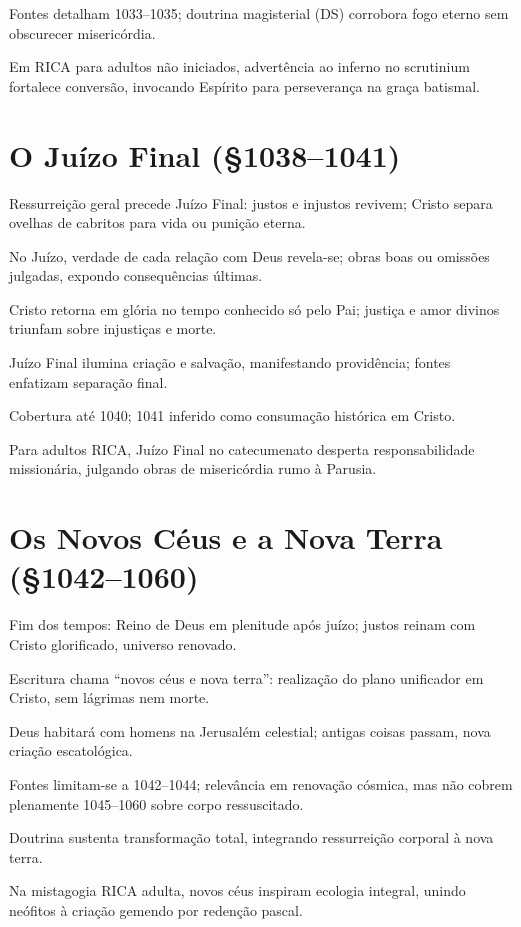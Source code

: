 Fontes detalham 1033--1035; doutrina magisterial (DS) corrobora fogo eterno sem obscurecer misericórdia.

Em RICA para adultos não iniciados, advertência ao inferno no scrutinium fortalece conversão, invocando Espírito para perseverança na graça batismal.

\section{O Juízo Final (\S 1038--1041)}

Ressurreição geral precede Juízo Final: justos e injustos revivem; Cristo separa ovelhas de cabritos para vida ou punição eterna.

No Juízo, verdade de cada relação com Deus revela-se; obras boas ou omissões julgadas, expondo consequências últimas.

Cristo retorna em glória no tempo conhecido só pelo Pai; justiça e amor divinos triunfam sobre injustiças e morte.

Juízo Final ilumina criação e salvação, manifestando providência; fontes enfatizam separação final.

Cobertura até 1040; 1041 inferido como consumação histórica em Cristo.

Para adultos RICA, Juízo Final no catecumenato desperta responsabilidade missionária, julgando obras de misericórdia rumo à Parusia.

\section{Os Novos Céus e a Nova Terra (\S 1042--1060)}

Fim dos tempos: Reino de Deus em plenitude após juízo; justos reinam com Cristo glorificado, universo renovado.

Escritura chama ``novos céus e nova terra'': realização do plano unificador em Cristo, sem lágrimas nem morte.

Deus habitará com homens na Jerusalém celestial; antigas coisas passam, nova criação escatológica.

Fontes limitam-se a 1042--1044; relevância em renovação cósmica, mas não cobrem plenamente 1045--1060 sobre corpo ressuscitado.

Doutrina sustenta transformação total, integrando ressurreição corporal à nova terra.

Na mistagogia RICA adulta, novos céus inspiram ecologia integral, unindo neófitos à criação gemendo por redenção pascal.


